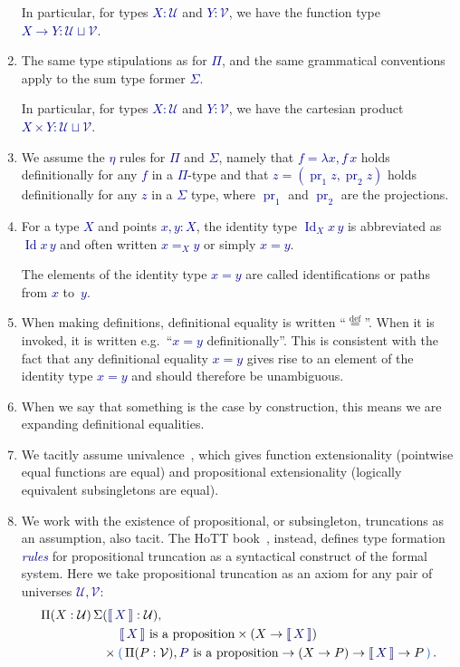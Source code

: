 \documentclass[10pt]{article}
\makeatletter
\newcommand{\db}{\textcolor{darkblue}}
\newcommand\leftcolor[2]{%
  \edef\@tempa{#1}%
  \ifx\@tempa\@empty
    \edef\@tempa{darkblue}%
  \fi
 \mathinner\bgroup\begingroup\color{\@tempa}\left#2\normalcolor%
}
\newcommand\rightcolor[2]{%
  \edef\@tempa{#1}%
  \ifx\@tempa\@empty
    \edef\@tempa{darkblue}%
  \fi
  \color{\@tempa}\right#2\endgroup\egroup%
}
\newcommand{\bracket}[1]{\leftcolor{darkgreen}(\,#1\,\rightcolor{darkgreen})}
\newcommand{\trunc}[1]{\leftcolor{darkblue}\llbracket\,\db{#1}\,\rightcolor{darkblue}\rrbracket}
\newcommand{\df}[1]{\emph{\db{#1}}}
\newcommand{\m}[1]{\db{$#1$}}
\newcommand{\fst}{\operatorname{pr}_1}
\newcommand{\snd}{\operatorname{pr}_2}
\newcommand{\U}{\mathcal{U}}
\newcommand{\V}{\mathcal{V}}
\newcommand{\Id}{\operatorname{Id}}
\newcommand{\eqdef}{\overset{\text{def}}{=}}
\newcommand{\idto}{=}
\theoremstyle{definition}
\makeatother
\begin{document}
\begin{enumerate}
  In particular, for types \m{X : \U} and \m{Y : \V}, we have the function
  type \m{X \to Y : \U \sqcup \V}.
\item The same type stipulations as for \m{\Pi}, and the same
  grammatical conventions apply to the sum type former \m{\Sigma}.

  In particular, for types \m{X : \U} and \m{Y : \V}, we have the cartesian product \m{X \times Y : \U \sqcup \V}.

\item We assume the \m{\eta} rules for \m{\Pi} and \m{\Sigma}, namely
  that \m{f = \lambda x, f \, x} holds definitionally for any \m{f} in
  a \m{\Pi}-type and that \m{z=(\fst z , \snd z)} holds definitionally
  for any \m{z} in a \m{\Sigma} type, where \m{\fst} and \m{\snd} are
  the projections.

\item For a type \m{X} and points \m{x,y:X}, the identity type \m{\Id_{X} x \, y} is abbreviated as \m{\Id x \, y} and often written \m{x \idto_X y} or simply \m{x \idto y}.

  The elements of the identity type \m{x=y} are called identifications
  or paths from \m{x} to~\m{y}.

\item When making definitions, definitional equality is written ``$\eqdef$''. When it is invoked, it is written e.g.\ ``\m{x = y} definitionally''. This is consistent with the fact that any definitional equality \m{x = y} gives rise to an element of the identity type \m{x = y} and should therefore be unambiguous.

\item When we say that something is the case by construction, this means we
  are expanding definitional equalities.

\item We tacitly assume univalence~\cite{hottbook}, which gives
  function extensionality (pointwise equal functions are equal) and
  propositional extensionality (logically equivalent subsingletons are
  equal).

\item We work with the existence of propositional, or subsingleton, truncations as an
  assumption, also tacit.  The HoTT book~\cite{hottbook}, instead,
  defines type formation \df{rules} for propositional truncation as a
  syntactical construct of the formal system. Here we take
  propositional truncation as an axiom for any pair of
  universes \m{\U,\V}: \db{
    \begin{align*}
      \Pi (X:\U)\,  \Sigma & (\trunc{X}  : \U), \\
      & \mathrel{\phantom{\times}} \text{\m{\trunc{X}} is a proposition} \times (X \to \trunc{X}) \\
  & \times \bracket{\Pi (P : \V), \text{\m{P} is a proposition} \to (X \to P) \to \trunc{X} \to P}.
    \end{align*}}


\end{enumerate}
\end{document}
